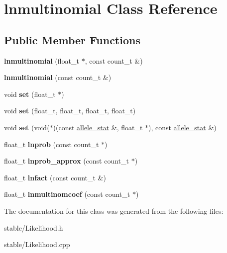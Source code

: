 \hypertarget{classlnmultinomial}{\section{lnmultinomial Class Reference}
\label{classlnmultinomial}
}
\subsection*{Public Member Functions}
\begin{DoxyCompactItemize}
\item 
\hypertarget{classlnmultinomial_a338ae23db2aed67713045e130622badc}{{\bfseries lnmultinomial} (float\-\_\-t $\ast$, const count\-\_\-t \&)}\label{classlnmultinomial_a338ae23db2aed67713045e130622badc}

\item 
\hypertarget{classlnmultinomial_a0918e1067d0d8bb764c49958dbc41ce8}{{\bfseries lnmultinomial} (const count\-\_\-t \&)}\label{classlnmultinomial_a0918e1067d0d8bb764c49958dbc41ce8}

\item 
\hypertarget{classlnmultinomial_a91dd77fd2c1ff0dd847727a0fe839e4b}{void {\bfseries set} (float\-\_\-t $\ast$)}\label{classlnmultinomial_a91dd77fd2c1ff0dd847727a0fe839e4b}

\item 
\hypertarget{classlnmultinomial_abc759e365df6d8daca003e5ecfdfca5c}{void {\bfseries set} (float\-\_\-t, float\-\_\-t, float\-\_\-t, float\-\_\-t)}\label{classlnmultinomial_abc759e365df6d8daca003e5ecfdfca5c}

\item 
\hypertarget{classlnmultinomial_a7532f39e8449f39a6b317b8b0cd28e4f}{void {\bfseries set} (void($\ast$)(const \hyperlink{classallele__stat}{allele\-\_\-stat} \&, float\-\_\-t $\ast$), const \hyperlink{classallele__stat}{allele\-\_\-stat} \&)}\label{classlnmultinomial_a7532f39e8449f39a6b317b8b0cd28e4f}

\item 
\hypertarget{classlnmultinomial_a97f19c05ef64d56f1f41cffb78058b9d}{float\-\_\-t {\bfseries lnprob} (const count\-\_\-t $\ast$)}\label{classlnmultinomial_a97f19c05ef64d56f1f41cffb78058b9d}

\item 
\hypertarget{classlnmultinomial_af5a14d8dec973b79711a55a3a747b59e}{float\-\_\-t {\bfseries lnprob\-\_\-approx} (const count\-\_\-t $\ast$)}\label{classlnmultinomial_af5a14d8dec973b79711a55a3a747b59e}

\item 
\hypertarget{classlnmultinomial_ae01a4965d86572aef374ee5a8e56e81f}{float\-\_\-t {\bfseries lnfact} (const count\-\_\-t \&)}\label{classlnmultinomial_ae01a4965d86572aef374ee5a8e56e81f}

\item 
\hypertarget{classlnmultinomial_aae7815c87e3ce26c3469a2755504fea4}{float\-\_\-t {\bfseries lnmultinomcoef} (const count\-\_\-t $\ast$)}\label{classlnmultinomial_aae7815c87e3ce26c3469a2755504fea4}

\end{DoxyCompactItemize}


The documentation for this class was generated from the following files\-:\begin{DoxyCompactItemize}
\item 
stable/Likelihood.\-h\item 
stable/Likelihood.\-cpp\end{DoxyCompactItemize}
